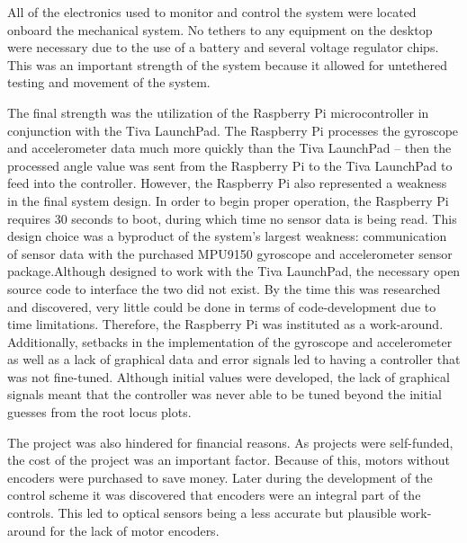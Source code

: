 \documentclass[11pt]{report}
\begin{document}
\begin{spacing}{1.5}
    All of the electronics used to monitor and control the system were located onboard the mechanical system. No tethers to any equipment on the desktop were necessary due to the use of a battery and several voltage regulator chips. This was an important strength of the system because it allowed for untethered testing and movement of the system. 
    
    The final strength was the utilization of the Raspberry Pi microcontroller in conjunction with the Tiva LaunchPad. The Raspberry Pi processes the gyroscope and accelerometer data much more quickly than the Tiva LaunchPad – then the processed angle value was sent from the Raspberry Pi to the Tiva LaunchPad to feed into the controller. However, the Raspberry Pi also represented a weakness in the final system design. In order to begin proper operation, the Raspberry Pi requires 30 seconds to boot, during which time no sensor data is being read. This design choice was a byproduct of the system’s largest weakness: communication of sensor data with the purchased MPU9150 gyroscope and accelerometer sensor package.Although designed to work with the Tiva LaunchPad, the necessary open source code to interface the two did not exist. By the time this was researched and discovered, very little could be done in terms of code-development due to time limitations. Therefore, the Raspberry Pi was instituted as a work-around. Additionally, setbacks in the implementation of the gyroscope and accelerometer as well as a lack of graphical data and error signals led to having a controller that was not fine-tuned. Although initial values were developed, the lack of graphical signals meant that the controller was never able to be tuned beyond the initial guesses from the root locus plots. 
    
    The project was also hindered for financial reasons. As projects were self-funded, the cost of the project was an important factor. Because of this, motors without encoders were purchased to save money. Later during the development of the control scheme it was discovered that encoders were an integral part of the controls. This led to optical sensors being a less accurate but plausible work-around for the lack of motor encoders. 
    

\end{spacing}
\end{document}
